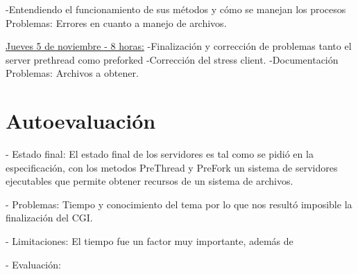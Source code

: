 \documentclass{report}
\begin{document}
{{{{{{{-Entendiendo el funcionamiento de sus métodos y cómo se manejan los procesos
\newline
\newline
Problemas: Errores en cuanto a manejo de archivos.
\newline
\newline
{\underline {Jueves 5 de noviembre - 8 horas:}
\newline
-Finalización y corrección de problemas tanto el server prethread como preforked\newline
-Corrección del stress client.\newline
-Documentación
\newline
\newline
Problemas: Archivos a obtener.
\newpage
\section{Autoevaluaci\'on}
\newline
\newline
- Estado final: \newline
El estado final de los servidores es tal como se pidi\'o en la especificaci\'on, con los metodos PreThread y PreFork
un sistema de servidores ejecutables que permite obtener recursos de un sistema de archivos.\newline

\newline
\newline

- Problemas:\newline
Tiempo y conocimiento del tema por lo que nos result\'o imposible la finalizaci\'on del CGI. \newline

\newline
\newline

- Limitaciones:\newline
El tiempo fue un factor muy importante, además de 
\newline

- Evaluaci\'on: \newline

}}}}}}}}
\end{document}
